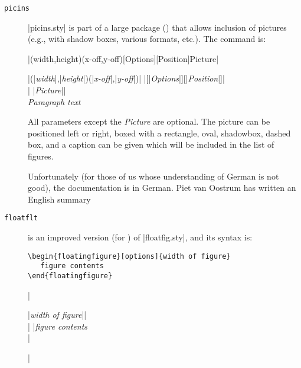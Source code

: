 \begin{description}
\item[\texttt{picins}] \File|picins.sty| is part of a large package
  () that allows inclusion of pictures (e.g., with
  shadow boxes, various \MSDOS{} formats, etc.).  The command is:

\begin{htmlversion}
    |\parpic(width,height)(x-off,y-off)[Options][Position]{Picture}|\\
\end{htmlversion}
  \htmlignore
  \def\breakhere{\penalty0\hskip0pt\relax}
  |\parpic(|\emph{width}|,|\emph{height}|)(|\emph{x-off}|,|\emph{y-off}|)|%
  |[|\emph{Options}|][|\emph{Position}|]|\\
  |       {|\emph{Picture}|}|\\
  \endhtmlignore
  \emph{Paragraph text}

  All parameters except the \emph{Picture} are optional.  The picture
  can be positioned left or right, boxed with a rectangle, oval,
  shadowbox, dashed box, and a caption can be given which will be
  included in the list of figures.


  Unfortunately (for those of us whose understanding of German is not
  good), the documentation is in German.  Piet van Oostrum has written
  an English summary 
\item[\texttt{floatflt}]  is an improved version
  (for \LaTeXe{}) of \File|floatfig.sty|, and its syntax is:

\begin{htmlversion}
\begin{verbatim}
\begin{floatingfigure}[options]{width of figure}
   figure contents
\end{floatingfigure}
\end{verbatim}
\end{htmlversion}
  \htmlignore
  |\begin{floatingfigure}{|\emph{width of figure}|}|\\
  |   |\emph{figure contents}\\
  |\end{floatingfigure}|
  \endhtmlignore


\end{description}
